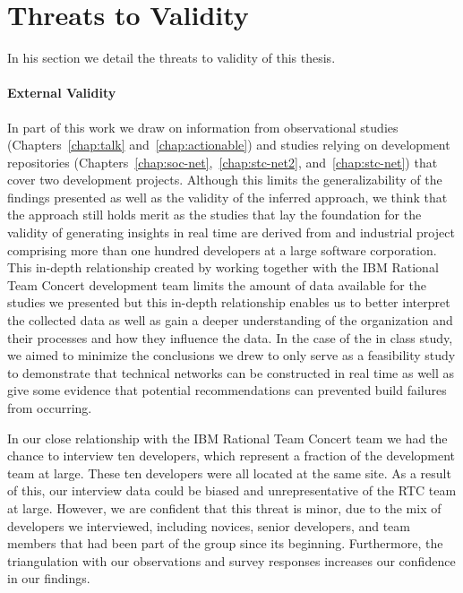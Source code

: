\section{Threats to Validity}
\label{sec:threat}
In his section we detail the threats to validity of this thesis.

\paragraph{External Validity}
In part of this work we draw on information from observational studies (Chapters~\ref{chap:talk} and~\ref{chap:actionable}) and studies relying on development repositories (Chapters~\ref{chap:soc-net},~\ref{chap:stc-net2}, and~\ref{chap:stc-net}) that cover two development projects.
Although this limits the generalizability of the findings presented as well as the validity of the inferred approach, we think that the approach still holds merit as the studies that lay the foundation for the validity of generating insights in real time are derived from and industrial project comprising more than one hundred developers at a large software corporation.
This in-depth relationship created by working together with the IBM Rational Team Concert development team limits the amount of data available for the studies we presented but this in-depth relationship enables us to better interpret the collected data as well as gain a deeper understanding of the organization and their processes and how they influence the data.
In the case of the in class study, we aimed to minimize the conclusions we drew to only serve as a feasibility study to demonstrate that technical networks can be constructed in real time as well as give some evidence that potential recommendations can prevented build failures from occurring.

In our close relationship with the IBM Rational Team Concert team we had the chance to interview ten developers, which represent a fraction of the development team at large. These ten developers were all located at the same site. As a result of this, our interview data could be biased and unrepresentative of the RTC team at large.
However, we are confident that this threat is minor, due to the mix of developers we interviewed, including novices, senior developers, and team members that had been part of the group since its beginning.
Furthermore, the triangulation with our observations and survey responses increases our confidence in our findings.

